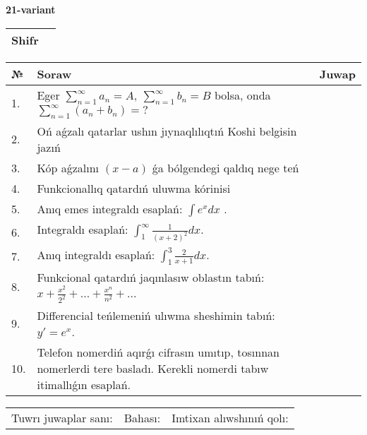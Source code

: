\documentclass{article}
\begin{document}
  \egroup
  
  \newpage
  
  
  \textbf{21-variant}\\
  
  \bgroup
  \def\arraystretch{1.6} %
  
  \begin{tabular}{|m{5.7cm}|m{9.5cm}|}
  \hline
  Shifr & \\
  \hline
  \end{tabular}
  
  \vspace{1cm}
  
  \begin{tabular}{|m{0.7cm}|m{10cm}|m{4cm}|}
  \hline
  № & Soraw & Juwap \\
  \hline
  1. & Eger \(\sum_{n = 1}^{\infty}a_{n} = A,\ \sum_{n = 1}^{\infty}b_{n} = B\) bolsa, onda \(\sum_{n = 1}^{\infty}\left( a_{n} + b_{n} \right) = ?\) &  \\
  \hline
  2. & Oń aǵzalı qatarlar ushın jıynaqlılıqtıń Koshi belgisin jazıń &  \\
  \hline
  3. & Kóp aǵzalını \((x - a)\) ǵa bólgendegi qaldıq nege teń &  \\
  \hline
  4. & Funkcionallıq qatardıń uluwma kórinisi &  \\
  \hline
  5. & Anıq emes integraldı esaplań: \(\int{e^{x}dx}\) . &  \\
  \hline
  6. & Integraldı esaplań: \(\int_{1}^{\infty}{\frac{1}{(x + 2)^2 }dx}\). &  \\
  \hline
  7. & Anıq integraldı esaplań: \(\int_{1}^{3}\frac{2}{x + 1}dx\). &  \\
  \hline
  8. & Funkcional qatardıń jaqınlasıw oblastın tabıń: \(x + \frac{x^2 }{2^2 } + ... + \frac{x^{n}}{n^2 } + ...\) &  \\
  \hline
  9. & Differencial teńlemeniń ulıwma sheshimin tabıń: \(y' = e^{x}\). &  \\
  \hline
  10. & Telefon nomerdiń aqırǵı cifrasın umıtıp, tosınnan nomerlerdi tere basladı. Kerekli nomerdi tabıw itimallıǵın esaplań. &  \\
  \hline
  \end{tabular}
  
  \vspace{1cm}
  
  \begin{tabular}{lll}
  Tuwrı juwaplar sanı: \underline{\hspace{1.5cm}} & 
  Bahası: \underline{\hspace{1.5cm}} & 
  Imtixan alıwshınıń qolı: \underline{\hspace{2cm}} \\
  \end{tabular}
  
\end{document}
